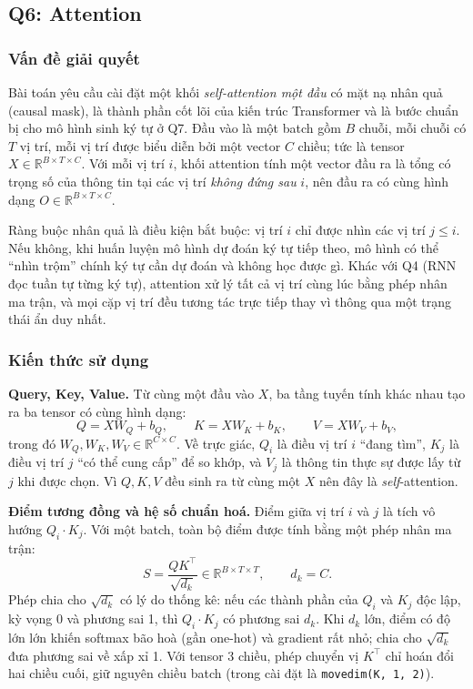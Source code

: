 \subsection{Q6: Attention}

\subsubsection{Vấn đề giải quyết}
Bài toán yêu cầu cài đặt một khối \emph{self-attention một đầu} có mặt nạ nhân
quả (causal mask), là thành phần cốt lõi của kiến trúc Transformer và là bước
chuẩn bị cho mô hình sinh ký tự ở Q7. Đầu vào là một batch gồm $B$ chuỗi, mỗi
chuỗi có $T$ vị trí, mỗi vị trí được biểu diễn bởi một vector $C$ chiều; tức là
tensor $X \in \mathbb{R}^{B \times T \times C}$. Với mỗi vị trí $i$, khối
attention tính một vector đầu ra là tổng có trọng số của thông tin tại các vị
trí \emph{không đứng sau} $i$, nên đầu ra có cùng hình dạng
$O \in \mathbb{R}^{B \times T \times C}$.

Ràng buộc nhân quả là điều kiện bắt buộc: vị trí $i$ chỉ được nhìn các vị trí
$j \le i$. Nếu không, khi huấn luyện mô hình dự đoán ký tự tiếp theo, mô hình có
thể ``nhìn trộm'' chính ký tự cần dự đoán và không học được gì. Khác với Q4
(RNN đọc tuần tự từng ký tự), attention xử lý tất cả vị trí cùng lúc bằng phép
nhân ma trận, và mọi cặp vị trí đều tương tác trực tiếp thay vì thông qua một
trạng thái ẩn duy nhất.

\subsubsection{Kiến thức sử dụng}

\textbf{Query, Key, Value.} Từ cùng một đầu vào $X$, ba tầng tuyến tính khác nhau
tạo ra ba tensor có cùng hình dạng:
\begin{equation}
Q = X W_Q + b_Q, \qquad K = X W_K + b_K, \qquad V = X W_V + b_V,
\end{equation}
trong đó $W_Q, W_K, W_V \in \mathbb{R}^{C \times C}$. Về trực giác, $Q_i$ là điều
vị trí $i$ ``đang tìm'', $K_j$ là điều vị trí $j$ ``có thể cung cấp'' để so
khớp, và $V_j$ là thông tin thực sự được lấy từ $j$ khi được chọn. Vì $Q, K, V$
đều sinh ra từ cùng một $X$ nên đây là \emph{self}-attention.

\textbf{Điểm tương đồng và hệ số chuẩn hoá.} Điểm giữa vị trí $i$ và $j$ là tích
vô hướng $Q_i \cdot K_j$. Với một batch, toàn bộ điểm được tính bằng một phép
nhân ma trận:
\begin{equation}
S = \frac{Q K^{\top}}{\sqrt{d_k}} \in \mathbb{R}^{B \times T \times T}, \qquad d_k = C.
\end{equation}
Phép chia cho $\sqrt{d_k}$ có lý do thống kê: nếu các thành phần của $Q_i$ và
$K_j$ độc lập, kỳ vọng 0 và phương sai 1, thì $Q_i \cdot K_j$ có phương sai $d_k$.
Khi $d_k$ lớn, điểm có độ lớn lớn khiến softmax bão hoà (gần one-hot) và gradient
rất nhỏ; chia cho $\sqrt{d_k}$ đưa phương sai về xấp xỉ 1. Với tensor 3 chiều,
phép chuyển vị $K^{\top}$ chỉ hoán đổi hai chiều cuối, giữ nguyên chiều batch
(trong cài đặt là \texttt{movedim(K, 1, 2)}).

